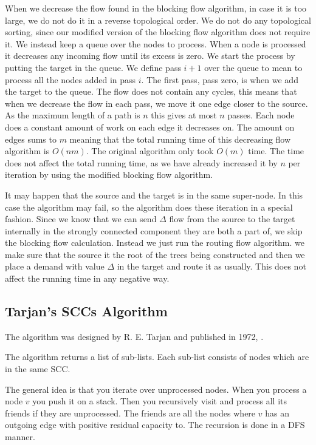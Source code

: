 When we decrease the flow found in the blocking flow algorithm, in case it is too large, we do not do it in a reverse topological order. 
We do not do any topological sorting, since our modified version of the blocking flow algorithm does not require it.
We instead keep a queue over the nodes to process. When a node is processed it decreases any incoming flow until its excess is zero. 
We start the process by putting the target in the queue. We define pass $i+1$ over the queue to mean to process all the nodes added in pass $i$.
The first pass, pass zero, is when we add the target to the queue. The flow does not contain any cycles, this means that when we decrease the
flow in each pass, we move it one edge closer to the source. As the maximum length of a path is $n$ this gives at most $n$ passes.
Each node does a constant amount of work on each edge it decreases on. The amount on edges sums to $m$ meaning that the total running time
of this decreasing flow algorithm is $O(nm)$. The original algorithm only took $O(m)$ time. The time does not affect the total running time,
as we have already increased it by $n$ per iteration by using the modified blocking flow algorithm.

It may happen that the source and the target is in the same super-node. In this case the algorithm may fail, so the algorithm does these iteration in a special 
fashion. Since we know that we can send $\Delta$ flow from the source to the target internally in the strongly connected component they are both a part
of, we skip the blocking flow calculation. Instead we just run the routing flow algorithm. we make sure that the source it the root of the trees being
constructed and then we place a demand with value $\Delta$ in the target and route it as usually. This does not affect the running time in any negative way.


\subsection{Tarjan's SCCs Algorithm} \label{GR-SCC}
The algorithm was designed by R. E. Tarjan and published in 1972, \cite{Tarjan1972}.

The algorithm returns a list of sub-lists. Each sub-list consists of nodes which are in the same SCC.

The general idea is that you iterate over unprocessed nodes. When you process a node $v$ you push it on a stack. Then you recursively visit and process all
its friends if they are unprocessed. The friends are all the nodes where $v$ has an outgoing edge with positive residual capacity to.
The recursion is done in a DFS manner.

